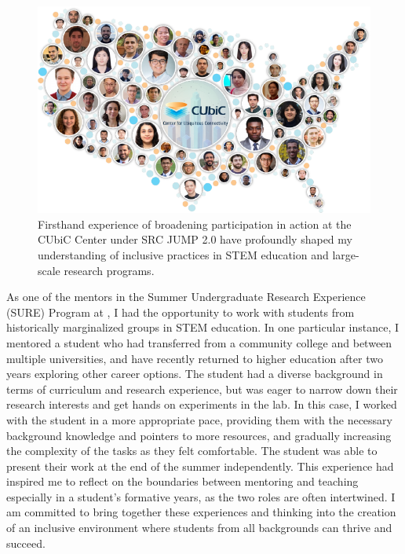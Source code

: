 \begin{figure}
    \vspace{-1em}
    \begin{center}
        \includegraphics[width=\linewidth]{../../6_figures/ds_fig_cubic.pdf}
    \end{center}
    \caption{Firsthand experience of broadening participation in action at the CUbiC Center under SRC JUMP 2.0 have profoundly shaped my understanding of inclusive practices in STEM education and large-scale research programs.}
    \label{fig:cubic}
    \vspace{-0.5em}
\end{figure}

As one of the mentors in the Summer Undergraduate Research Experience (SURE) Program at \mySchoolShort{}, I had the opportunity to work with students from historically marginalized groups in STEM education. In one particular instance, I mentored a student who had transferred from a community college and between multiple universities, and have recently returned to higher education after two years exploring other career options. The student had a diverse background in terms of curriculum and research experience, but was eager to narrow down their research interests and get hands on experiments in the lab. In this case, I worked with the student in a more appropriate pace, providing them with the necessary background knowledge and pointers to more resources, and gradually increasing the complexity of the tasks as they felt comfortable. The student was able to present their work at the end of the summer independently. This experience had inspired me to reflect on the boundaries between mentoring and teaching especially in a student's formative years, as the two roles are often intertwined. I am committed to bring together these experiences and thinking into the creation of an inclusive environment where students from all backgrounds can thrive and succeed.

